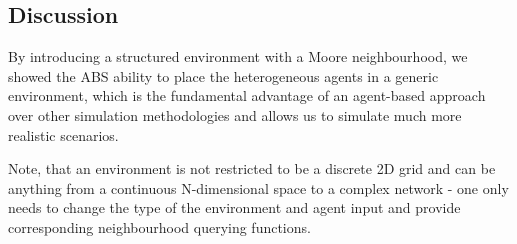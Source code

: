 \subsection{Discussion}
By introducing a structured environment with a Moore neighbourhood, we showed the ABS ability to place the heterogeneous agents in a generic environment, which is the fundamental advantage of an agent-based approach over other simulation methodologies and allows us to simulate much more realistic scenarios.

Note, that an environment is not restricted to be a discrete 2D grid and can be anything from a continuous N-dimensional space to a complex network - one only needs to change the type of the environment and agent input and provide corresponding neighbourhood querying functions. 